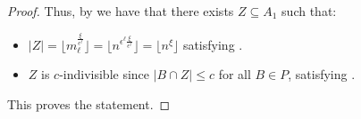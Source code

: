 \begin{lemma}[Claim 4.21]
\begin{proof}
            Thus, by  we have that there exists $Z \subseteq A_1$ such that:
            \begin{itemize}
                \item $|Z| = \lfloor m_\ell^{\frac{\xi}{\epsilon^\ell}} \rfloor = \lfloor n^{\epsilon^\ell \frac{\xi}{\epsilon^\ell}} \rfloor
                    = \lfloor n^\xi \rfloor$ satisfying .
                \item $Z$ is $c$-indivisible since $|B \cap Z| \leq c$ for all $B \in P$,
                    satisfying .
            \end{itemize}
            This proves the statement.
        \end{proof}
    \end{lemma}

